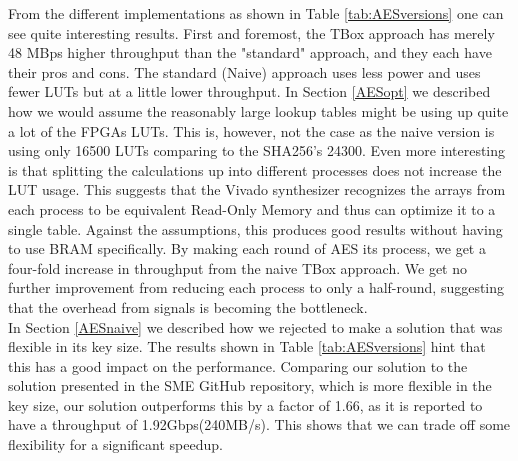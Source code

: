 \documentclass[a4paper, openany]{book}
\begin{document}
\begin{abstact}
From the different implementations as shown in Table \ref{tab:AESversions} one can see quite interesting results. First and foremost, the TBox approach has merely 48 MBps higher throughput than the "standard" approach, and they each have their pros and cons. The standard (Naive) approach uses less power and uses fewer LUTs but at a little lower throughput. In Section \ref{AESopt} we described how we would assume the reasonably large lookup tables might be using up quite a lot of the FPGAs LUTs. This is, however, not the case as the naive version is using only 16500 LUTs comparing to the SHA256's 24300. Even more interesting is that splitting the calculations up into different processes does not increase the LUT usage. This suggests that the Vivado synthesizer recognizes the arrays from each process to be equivalent Read-Only Memory and thus can optimize it to a single table. Against the assumptions, this produces good results without having to use BRAM specifically. By making each round of AES its process, we get a four-fold increase in throughput from the naive TBox approach. We get no further improvement from reducing each process to only a half-round, suggesting that the overhead from signals is becoming the bottleneck.\\
In Section \ref{AESnaive} we described how we rejected to make a solution that was flexible in its key size. The results shown in Table \ref{tab:AESversions} hint that this has a good impact on the performance. Comparing our solution to the solution presented in the SME GitHub repository, which is more flexible in the key size, our solution outperforms this by a factor of 1.66, as it is reported to have a throughput of 1.92Gbps(240MB/s)\cite{sme}. This shows that we can trade off some flexibility for a significant speedup.


\end{abstact}
\end{document}
